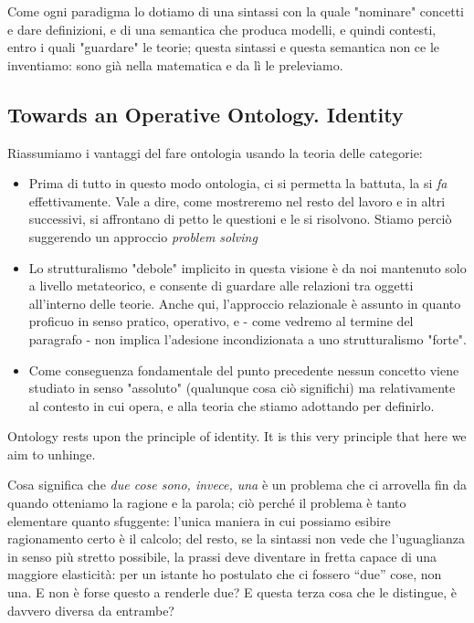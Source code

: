 \documentclass[a4paper, 11pt]{article}
\begin{document}
	Come ogni paradigma lo dotiamo di una sintassi con la quale "nominare" concetti e dare definizioni, e di una semantica che produca modelli, e quindi contesti, entro i quali "guardare" le teorie; questa sintassi e questa semantica non ce le inventiamo: sono già nella matematica e da lì le preleviamo. 
	
	
	\subsection{Towards an Operative Ontology. Identity}
	
	Riassumiamo i vantaggi del fare ontologia usando la teoria delle categorie:
	\begin{itemize}
		\item Prima di tutto in questo modo ontologia, ci si permetta la battuta, la si \emph{fa} effettivamente. Vale a dire, come mostreremo nel resto del lavoro e in altri successivi, si affrontano di petto le questioni e le si risolvono. Stiamo perciò suggerendo un approccio \emph{problem solving}
		\item Lo strutturalismo "debole" implicito in questa visione è da noi mantenuto solo a livello metateorico, e consente di guardare alle relazioni tra oggetti all'interno delle teorie. Anche qui, l'approccio relazionale è assunto in quanto proficuo in senso pratico, operativo, e - come vedremo al termine del paragrafo - non implica l'adesione incondizionata a uno strutturalismo "forte".
		\item Come conseguenza fondamentale del punto precedente nessun concetto viene studiato in senso "assoluto" (qualunque cosa ciò significhi) ma relativamente al contesto in cui opera, e alla teoria che stiamo adottando per definirlo.  
	\end{itemize}
	Ontology rests upon the principle of identity. It is this very principle that here we aim to unhinge.
	
	Cosa significa che \emph{due cose sono, invece, una} è un problema che ci arrovella fin da quando otteniamo la ragione e la parola; ciò perché il problema è tanto elementare quanto sfuggente: l'unica maniera in cui possiamo esibire ragionamento certo è il calcolo; del resto, se la sintassi non vede che l'uguaglianza in senso più stretto possibile, la prassi deve diventare in fretta capace di una maggiore elasticità: per un istante ho postulato che ci fossero ``due'' cose, non una. E non è forse questo a renderle due? E questa terza cosa che le distingue, è davvero diversa da entrambe?
	
\end{document}
